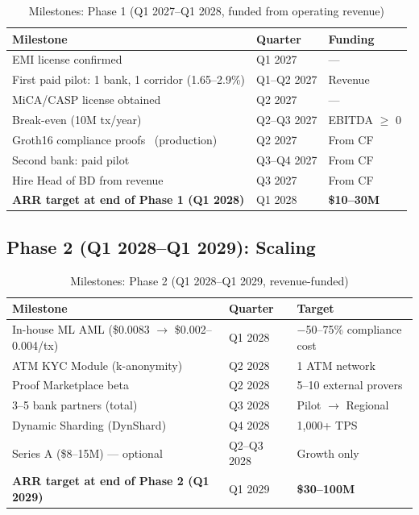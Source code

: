 \documentclass[11pt,a4paper]{article}
\begin{document}
\begin{table}[htbp]
\centering
\caption{Milestones: Phase 1 (Q1 2027--Q1 2028, funded from operating revenue)}
\small
\begin{tabularx}{\linewidth}{@{}Xll@{}}
\toprule
\textbf{Milestone} & \textbf{Quarter} & \textbf{Funding} \\
\midrule
EMI license confirmed~\cite{lb_emi} & Q1 2027  & --- \\
First paid pilot: 1 bank, 1 corridor (1.65--2.9\%)                 & Q1--Q2 2027 & Revenue \\
MiCA/CASP license obtained~\cite{mica_reg,esma_mica}                                          & Q2 2027  & --- \\
Break-even (10M tx/year)                                            & Q2--Q3 2027 & EBITDA $\geq$ 0 \\
Groth16 compliance proofs~\cite{groth16} (production)                              & Q2 2027  & From CF \\
Second bank: paid pilot                                             & Q3--Q4 2027 & From CF \\
Hire Head of BD from revenue                                        & Q3 2027  & From CF \\
\textbf{ARR target at end of Phase 1 (Q1 2028)}               & Q1 2028        & \textbf{\$10--30M} \\
\bottomrule
\end{tabularx}
\end{table}

\subsection*{Phase 2 (Q1 2028--Q1 2029): Scaling}

\begin{table}[htbp]
\centering
\caption{Milestones: Phase 2 (Q1 2028--Q1 2029, revenue-funded)}
\small
\begin{tabularx}{\linewidth}{@{}Xll@{}}
\toprule
\textbf{Milestone} & \textbf{Quarter} & \textbf{Target} \\
\midrule
In-house ML AML (\$0.0083 $\to$ \$0.002--0.004/tx)~\cite{fatf_aml_tech}      & Q1 2028  & $-$50--75\% compliance cost \\
ATM KYC Module (k-anonymity)                             & Q2 2028  & 1 ATM network \\
Proof Marketplace beta~\cite{zk_rollups}                                   & Q2 2028  & 5--10 external provers \\
3--5 bank partners (total)                               & Q3 2028  & Pilot $\to$ Regional \\
Dynamic Sharding (DynShard)~\cite{ton_docs}                      & Q4 2028  & 1,000+ TPS \\
Series A (\$8--15M) --- optional                         & Q2--Q3 2028    & Growth only \\
\textbf{ARR target at end of Phase 2 (Q1 2029)}         & Q1 2029        & \textbf{\$30--100M} \\
\bottomrule
\end{tabularx}
\end{table}
\end{document}
